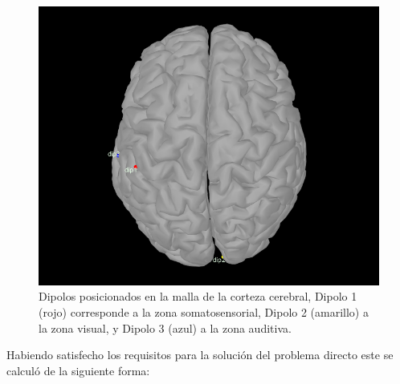 \begin{figure}[tb]
	\centering
	\includegraphics[width=\textwidth]{gfx/dipoles.png}
	\caption{Dipolos posicionados en la malla de la corteza cerebral, Dipolo 1 (rojo) corresponde a la zona somatosensorial, Dipolo 2 (amarillo) a la zona visual, y Dipolo 3 (azul) a la zona auditiva.}
	\label{fig:dipoles}
\end{figure}

Habiendo satisfecho los requisitos para la solución del problema directo este se calculó de la siguiente forma:

